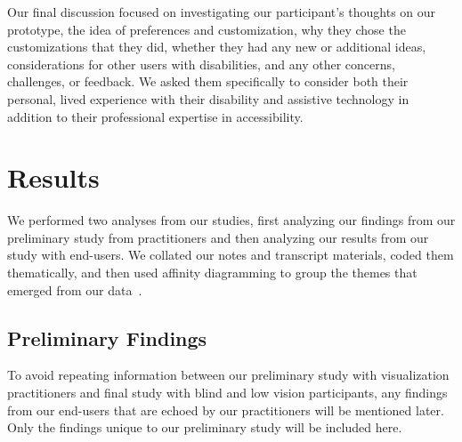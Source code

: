 \documentclass[12pt]{cmuthesis}
\begin{document}
Our final discussion focused on investigating our participant's thoughts on our prototype, the idea of preferences and customization, why they chose the customizations that they did, whether they had any new or additional ideas, considerations for other users with disabilities, and any other concerns, challenges, or feedback. We asked them specifically to consider both their personal, lived experience with their disability and assistive technology in addition to their professional expertise in accessibility.

\section{Results}

We performed two analyses from our studies, first analyzing our findings from our preliminary study from practitioners and then analyzing our results from our study with end-users. We collated our notes and transcript materials, coded them thematically, and then used affinity diagramming to group the themes that emerged from our data~\cite{Harboe2015}.

\subsection{Preliminary Findings}
To avoid repeating information between our preliminary study with visualization practitioners and final study with blind and low vision participants, any findings from our end-users that are echoed by our practitioners will be mentioned later. Only the findings unique to our preliminary study will be included here.
\end{document}
